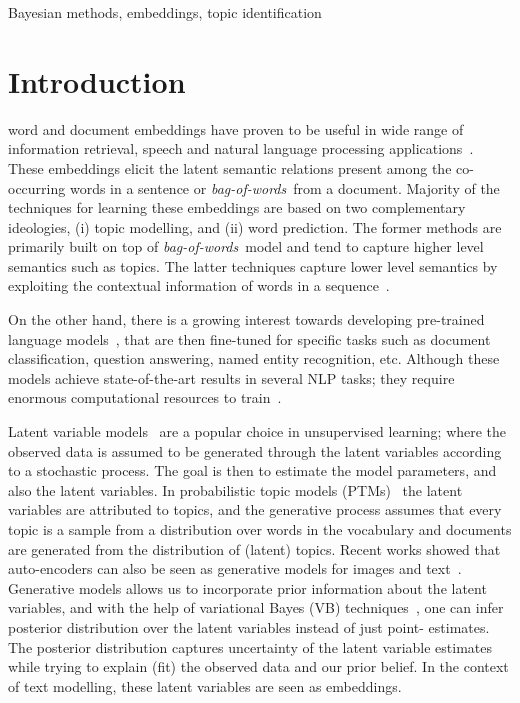 \documentclass[journal]{IEEEtran}
\newcommand{\bow}{\textit{bag-of-words}}
\begin{document}
\begin{IEEEkeywords}
Bayesian methods, embeddings, topic identification
\end{IEEEkeywords}


\IEEEpeerreviewmaketitle



\section{Introduction}
\label{sec:intro}
 word and document embeddings have proven to be useful
in wide range of information retrieval, speech and natural language processing
applications~\cite{Wei:2006:LDA_IR,Mikolov:2012:LM_adap,Win:2014:STD,Chen:2015:LM_adap,Benes:2018}. 
These embeddings elicit the latent semantic relations present among the
co-occurring words in a sentence or \bow~from a document. Majority of the
techniques for learning these embeddings are based on two complementary
ideologies, (i) topic modelling, and (ii) word prediction. The former methods
are primarily built on top of \bow~model and tend to capture higher level
semantics such as topics. The latter techniques capture lower level semantics
by exploiting the contextual information of words in a
sequence~\cite{Mikolov:2013:word2vec,Jeffrey:2014:GloVe,Quoc:2014:PV}.

On the other hand, there is a growing interest towards developing pre-trained
language models~\cite{Ruder:2018:Universal,Peters:2018:ELMO}, that are then
fine-tuned for specific tasks such as document classification, question
answering, named entity recognition, etc. Although these models achieve
state-of-the-art results in several NLP tasks; they require enormous
computational resources to train~\cite{Devlin:2018:BERT}.

Latent variable models~\cite{Bishop:1999:LVM} are a popular choice in
unsupervised learning; where the observed data is assumed to be generated
through the latent variables according to a stochastic process. The goal is
then to estimate the model parameters, and also the latent variables.
In probabilistic topic models (PTMs)~\cite{Blei:2012:PTM} the latent
variables are attributed to topics, and the generative process assumes that 
every topic is a sample from a distribution over words in the vocabulary and 
documents are generated from the distribution of (latent) topics. Recent works 
showed that auto-encoders can also be seen as generative models for images and
text~\cite{Kingma:2014:AEVB,NVI:2016}. Generative models allows us to
incorporate prior information about the latent variables, and with the help
of variational Bayes (VB) 
techniques~\cite{Bishop:2006:PRML,Kingma:2014:AEVB,Rezende:2014:SBP}, one can 
infer posterior distribution over the latent variables instead of just point-
estimates. The posterior distribution captures uncertainty of the latent 
variable estimates while trying to explain (fit) the observed data and our 
prior belief. In the context of text modelling, these latent variables are seen as embeddings.
\end{document}
